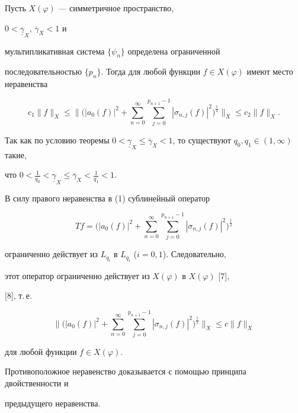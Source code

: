 \begin{thm} Пусть $X(\varphi)$ --- симметричное пространство, 


$0<\underline{\gamma}_{X},\, \overline{\gamma}_{X}<1$ и 


мультипликативная система $\{\psi_{n}\}$ определена ограниченной 


последовательностью $\{p_{n}\}$. Тогда для любой функции $f\in 


X(\varphi)$ имеют место неравенства


$$


c_{1}\|f\|_{X}\leq\bigg\|\bigg(| 


a_{0}(f)|^{2}+\sum_{n=0}^{\infty} \sum_{j=0}^{p_{n+1}-1} 


|\sigma_{n,j}(f)|^{2}\bigg)^{\frac{1}{2}}\bigg\|_{X}\leq 


c_{2}\|f\|_{X}.


$$


\end{thm}





\begin{pf}


Так как по условию теоремы $0<\underline{\gamma}_{X}\leq 


\overline{\gamma}_{X}<1$, то существуют $q_{0}, q_{1}\in (1, \infty)$ такие, 


что $0<\frac{1}{q_{0}}< \underline{\gamma}_{X}\leq 


\overline{\gamma}_{X}<\frac{1}{q_{1}}<1$. 


В силу правого неравенства в (1) сублинейный оператор 


$$


Tf=\bigg(| a_{0}(f)|^{2}+\sum_{n=0}^{\infty} \sum_{j=0}^{p_{n+1}-1}


|\sigma_{n,j}(f)|^{2}\bigg)^{\frac{1}{2}}


$$


ограниченно действует из $L_{q_{i}}$ в $L_{q_{i}}$ ($i=0,1$). Следовательно,


этот оператор ограниченно действует из $X(\varphi)$ в $X(\varphi)$ [7], 


[8], т.\,е.


$$


\bigg\|\bigg(| a_{0}(f)|^{2}+\sum_{n=0}^{\infty} \sum_{j=0}^{p_{n+1}-1}


|\sigma_{n,j}(f)|^{2}\bigg)^{\frac{1}{2}}\bigg\|_{X}\leq 


c\|f\|_{X}


$$


для любой функции $f\in X(\varphi)$.





Противоположное неравенство доказывается с помощью принципа двойственности и


предыдущего неравенства.


\end{pf}





